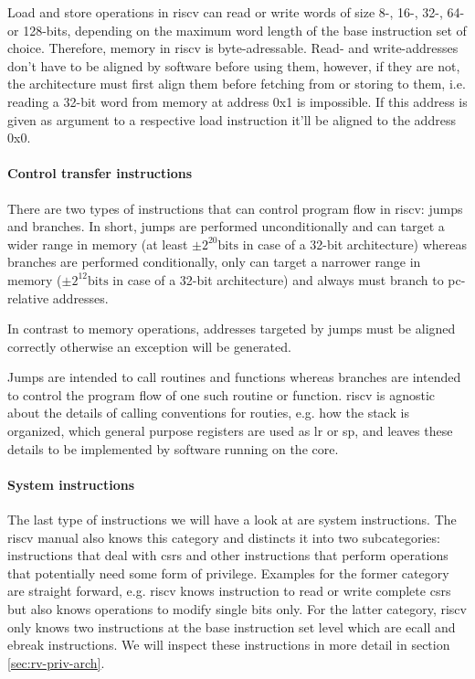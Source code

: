 Load and store operations in \gls{riscv} can read or write words of size 8-, 16-, 32-, 64- or 128-bits, depending on the maximum word length of the base instruction set of choice.
Therefore, memory in \gls{riscv} is byte-adressable.
Read- and write-addresses don't have to be aligned by software before using them, however, if they are not, the architecture must first align them before fetching from or storing to them, i.e. reading a 32-bit word from memory at address 0x1 is impossible.
If this address is given as argument to a respective load instruction it'll be aligned to the address 0x0.

\paragraph{Control transfer instructions}
There are two types of instructions that can control program flow in \gls{riscv}: jumps and branches.
In short, jumps are performed unconditionally and can target a wider range in memory (at least $ \pm 2^{20}\text{bits} $ in case of a 32-bit architecture) whereas branches are performed conditionally, only can target a narrower range in memory ($ \pm 2^{12}\text{bits} $ in case of a 32-bit architecture) and always must branch to \gls{pc}-relative addresses.

In contrast to memory operations, addresses targeted by jumps must be aligned correctly otherwise an exception will be generated.

Jumps are intended to call routines and functions whereas branches are intended to control the program flow of one such routine or function.
\gls{riscv} is agnostic about the details of calling conventions for routies, e.g. how the stack is organized, which general purpose registers are used as \gls{lr} or \gls{sp}, and leaves these details to be implemented by software running on the core.

\paragraph{System instructions}
The last type of instructions we will have a look at are system instructions.
The \gls{riscv} manual also knows this category and distincts it into two subcategories: instructions that deal with \glspl{csr} and other instructions that perform operations that potentially need some form of privilege.
Examples for the former category are straight forward, e.g. \gls{riscv} knows instruction to read or write complete \glspl{csr} but also knows operations to modify single bits only.
For the latter category, \gls{riscv} only knows two instructions at the base instruction set level which are \gls{ecall} and \gls{ebreak} instructions.
We will inspect these instructions in more detail in section \ref{sec:rv-priv-arch}.

